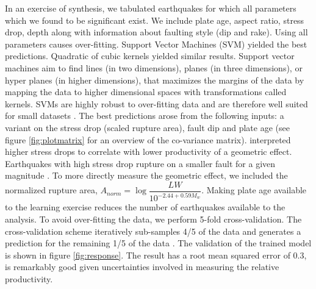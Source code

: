 \documentclass[12pt, notitlepage]{report}
\begin{document}
In an exercise of synthesis, we tabulated earthquakes for which all parameters which we found to be significant exist. We include plate age, aspect ratio, stress drop, depth along with information about faulting style (dip and rake). Using all parameters causes over-fitting. Support Vector Machines (SVM) yielded the best predictions. Quadratic of cubic kernels yielded similar results. Support vector machines aim to find lines (in two dimensions), planes (in three dimensions), or hyper planes (in higher dimensions), that maximizes the margins of the data by mapping the data to higher dimensional spaces with transformations called kernels. SVMs are highly robust to over-fitting data and are therefore well suited for small datasets \cite{Witten2016DataTechniques}. The best predictions arose from the following inputs: a variant on the stress drop (scaled rupture area), fault dip and plate age (see figure \ref{fig:plotmatrix} for an overview of the co-variance matrix). \textcite{Wetzler2016} interpreted higher stress drops to correlate with lower productivity of a geometric effect. Earthquakes with high stress drop rupture on a smaller fault for a given magnitude \cite{Scholz2019TheFaulting}. To more directly measure the geometric effect, we included the normalized rupture area, $A_{norm} = \log{\dfrac{LW}{10^{-2.44+0.59M_w}}}$. Making plate age available to the learning exercise reduces the number of earthquakes available to the analysis. To avoid over-fitting the data, we perform 5-fold cross-validation. The cross-validation scheme iteratively sub-samples 4/5 of the data and generates a prediction for the remaining 1/5 of the data \cite{Witten2016DataTechniques}. The validation of the trained model is shown in figure \ref{fig:response}. The result has a root mean squared error of 0.3, is remarkably good given uncertainties involved in measuring the relative productivity.
\end{document}
